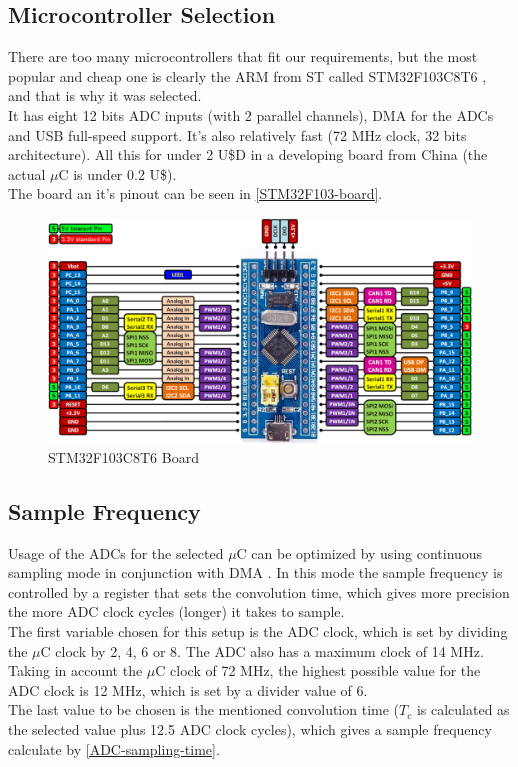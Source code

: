 \subsection{Microcontroller Selection}
There are too many microcontrollers that fit our requirements, but the most popular
and cheap one is clearly the ARM from ST called STM32F103C8T6 \cite{STM32F103},
and that is why it was selected. \\
It has eight 12 bits ADC inputs (with 2 parallel channels), DMA for the ADCs and USB full-speed support. It's
also relatively fast (72 MHz clock, 32 bits architecture). All this for under 2 U\$D
in a developing board from China (the actual $\mu$C is under 0.2 U\$). \\
The board an it's pinout can be seen in \autoref{STM32F103-board}.

\begin{figure}[htb]
  \centering
  \caption{STM32F103C8T6 Board}
  \label{STM32F103-board}
  \includegraphics[scale=0.3]{images/STM32F103-board.png}
\end{figure}

\subsection{Sample Frequency}
\label{firmware-sample-frequency}
Usage of the ADCs for the selected $\mu$C can be optimized by using continuous sampling
mode in conjunction with DMA \cite[ch. 11]{STM32F103}. In this mode the sample frequency is controlled by a register
that sets the convolution time, which gives more precision the more ADC clock
cycles (longer) it takes to sample.\\
The first variable chosen for this setup is the ADC clock, which is set by dividing
the $\mu$C clock by 2, 4, 6 or 8. The ADC also has a maximum clock of 14 MHz. Taking in
account the  $\mu$C clock of 72 MHz, the highest possible value for the ADC clock is 12 MHz,
which is set by a divider value of 6. \\
The last value to be chosen is the mentioned convolution time ($T_{c}$ is calculated as the selected
value plus 12.5 ADC clock cycles), which gives a sample frequency calculate by \autoref{ADC-sampling-time}.

